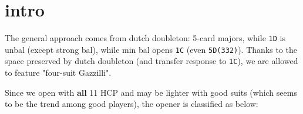 \section{intro}

The general approach comes from dutch doubleton: 5-card majors, while \texttt{1D} is unbal (except strong bal), while min bal opens \texttt{1C} (even \texttt{5D(332)}). 
Thanks to the space preserved by dutch doubleton (and transfer response to \texttt{1C}), we are allowed to feature "four-suit Gazzilli".


Since we open with \textbf{all} 11 HCP and may be lighter with good suits (which seems to be the trend among good players), the opener is classified as below:

